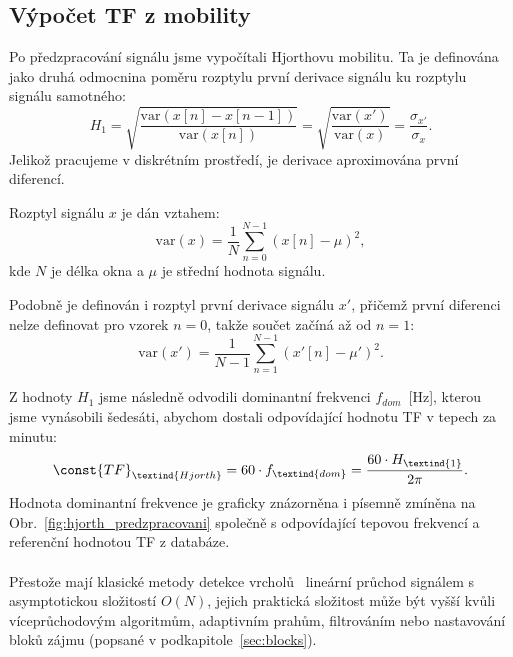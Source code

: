 \subsection*{Výpočet TF z mobility}
\label{sec:TF_mobilita}
Po předzpracování signálu jsme vypočítali Hjorthovu mobilitu.
Ta je definována~\cite{Hjorth1970,Geetika2022} jako druhá odmocnina poměru rozptylu první derivace signálu ku rozptylu signálu samotného:
\begin{equation}
	\label{eq:hjorth_mobility}
	H_1 = \sqrt{ \frac{ \mathrm{var}(x[n] - x[n-1]) }{ \mathrm{var}(x[n]) } }
	= \sqrt{ \frac{ \mathrm{var}(x') }{ \mathrm{var}(x) } }
	= \frac{ \sigma_{x'} }{ \sigma_{x} }.
\end{equation}
Jelikož pracujeme v diskrétním prostředí, je derivace aproximována první diferencí.

Rozptyl signálu \( x \) je dán vztahem:
\begin{equation}
	\label{eq:hjorth_var_signal}
	\mathrm{var}(x) = \frac{1}{N} \sum_{n=0}^{N-1} (x[n] - \mu)^2,
\end{equation}
kde \( N \) je délka okna a \( \mu \) je střední hodnota signálu.

Podobně je definován i rozptyl první derivace signálu \( x' \), přičemž první diferenci nelze definovat pro vzorek \( n = 0 \), takže součet začíná až od \( n = 1 \):
\begin{equation}
	\label{eq:hjorth_var_signal_diff}
	\mathrm{var}(x') = \frac{1}{N - 1} \sum_{n=1}^{N-1} (x'[n] - \mu')^2.
\end{equation}

Z hodnoty \( H_1 \) jsme následně odvodili dominantní frekvenci \( f_{dom} \)~[Hz], kterou jsme vynásobili šedesáti, abychom dostali odpovídající hodnotu \acs{TF} v tepech za minutu:
\begin{equation}
	\const{TF}_{\textind{Hjorth}} = 60 \cdot f_{\textind{dom}} = \frac{60 \cdot H_{\textind{1}}}{2\pi}.
\end{equation}
Hodnota dominantní frekvence je graficky znázorněna i písemně zmíněna na Obr.~\ref{fig:hjorth_predzpracovani} společně s odpovídající tepovou frekvencí a referenční hodnotou \acs{TF} z databáze.

\paragraph{}
Přestože mají klasické metody detekce vrcholů~\cite{Elgendi2013} lineární průchod signálem s asymptotickou složitostí \( O(N) \), jejich praktická složitost může být vyšší kvůli víceprůchodovým algoritmům, adaptivním prahům, filtrováním nebo nastavování bloků zájmu (popsané v podkapitole~\ref{sec:blocks}).

